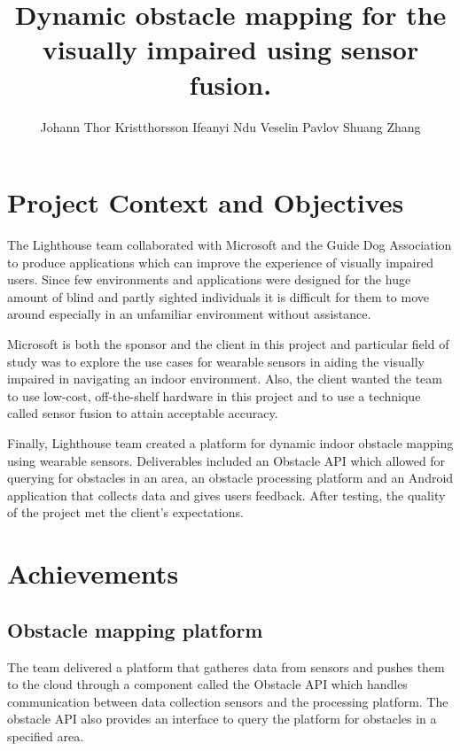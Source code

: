\documentclass[prodmode,acmtosem]{acmsmall} %
\begin{document}

\title{Dynamic obstacle mapping for the visually impaired using sensor fusion.}
\author{Johann Thor Kristthorsson
Ifeanyi Ndu
Veselin Pavlov
Shuang Zhang
}
\maketitle

\section{Project Context and Objectives}
The Lighthouse team collaborated with Microsoft and the Guide Dog Association to produce applications which can improve the experience of visually impaired users. Since few environments and applications were designed for the huge amount of blind and partly sighted individuals it is difficult for them to move around especially in an unfamiliar environment without assistance. 


Microsoft is both the sponsor and the client in this project and particular field of study was to explore the use cases for wearable sensors in aiding the visually impaired in navigating an indoor environment. Also, the client wanted the team to use low-cost, off-the-shelf hardware in this project and to use a technique called sensor fusion to attain acceptable accuracy.

Finally, Lighthouse team created a platform for dynamic indoor obstacle mapping using wearable sensors. Deliverables included an Obstacle API which allowed for querying for obstacles in an area, an obstacle processing platform and an Android application that collects data and gives users feedback. After testing, the quality of the project met the client's expectations.

\section{Achievements}
\subsection{Obstacle mapping platform}
The team delivered a platform that gatheres data from sensors and pushes them to the cloud through a component called the Obstacle API which handles communication between data collection sensors and the processing platform. The obstacle API also provides an interface to query the platform for obstacles in a specified area. 
\end{document}
